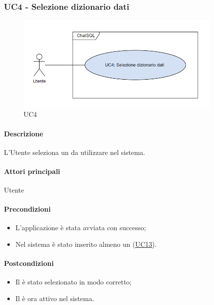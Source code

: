 \subsubsection{UC4 - Selezione dizionario dati}\label{UC4}

\begin{figure}[H]
  \centering
  \includegraphics[width=0.90\textwidth]{assets/uc4.png}
  \caption{UC4}
\end{figure}

\paragraph*{Descrizione}
L'Utente seleziona un  da utilizzare nel sistema.

\paragraph*{Attori principali}
Utente

\paragraph*{Precondizioni}
\begin{itemize}
  \item L'applicazione è stata avviata con successo;
  \item Nel sistema è stato inserito almeno un  (\hyperref[UC13]{UC13}).
\end{itemize}

\paragraph*{Postcondizioni}
\begin{itemize}
  \item Il  è stato selezionato in modo corretto;
  \item Il  è ora attivo nel sistema.
\end{itemize}

